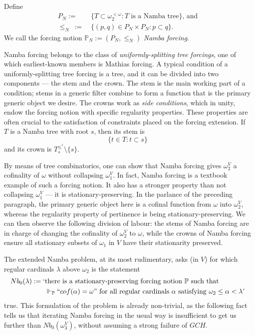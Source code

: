 \documentclass[12pt]{article}
\numberwithin{equation}{section}
\begin{document}
\begin{defi}[Namba]
Define
\begin{align*}
    P_N := \ & \{T \subset \omega_2^{< \omega} : T \text{ is a Namba tree}\} \text{, and} \\
    \leq_N \ := \ & \{(p, q) \in P_N \times P_N : p \subset q\}.
\end{align*}
We call the forcing notion $\mathbb{P}_N := (P_N, \leq_N)$ \emph{Namba forcing}.
\end{defi}

Namba forcing belongs to the class of \emph{uniformly-splitting tree forcings}, one of which earliest-known members is Mathias forcing. A typical condition of a uniformly-splitting tree forcing is a tree, and it can be divided into two components --- the stem and the crown. The stem is the main working part of a condition; stems in a generic filter combine to form a function that is the primary generic object we desire. The crowns work as \emph{side conditions}, which in unity, endow the forcing notion with specific regularity properties. These properties are often crucial to the satisfaction of constraints placed on the forcing extension. If $T$ is a Namba tree with root $s$, then its stem is $$\{t \in T : t \subset s\}$$ and its crown is $T_s^{\leq^{\dagger}} \setminus \{s\}$.

By means of tree combinatorics, one can show that Namba forcing gives $\omega_2^V$ a cofinality of $\omega$ without collapsing $\omega_1^V$. In fact, Namba forcing is a textbook example of such a forcing notion. It also has a stronger property than not collapsing $\omega_1^V$ --- it is stationary-preserving. In the parlance of the preceding paragraph, the primary generic object here is a cofinal function from $\omega$ into $\omega_2^V$, whereas the regularity property of pertinence is being stationary-preserving. We can then observe the following division of labour: the stems of Namba forcing are in charge of changing the cofinality of $\omega_2^V$ to $\omega$, while the crowns of Namba forcing ensure all stationary subsets of $\omega_1$ in $V$ have their stationarity preserved.

The extended Namba problem, at its most rudimentary, asks (in $V$) for which regular cardinals $\lambda$ above $\omega_2$ is the statement
\begin{align*}
    Nb_0(\lambda) := \text{`} & \text{there is a stationary-preserving forcing notion } \mathbb{P} \text{ such that} \\ 
    & \Vdash_{\mathbb{P}} ``cof(\alpha) = \omega" \text{ for all regular cardinals } \alpha \text{ satisfying } \omega_2 \leq \alpha < \lambda \text{'}
\end{align*} 
true. This formulation of the problem is already non-trivial, as the following fact tells us that iterating Namba forcing in the usual way is insufficient to get us further than $Nb_0(\omega_3^V)$, without assuming a strong failure of $GCH$. 
\end{document}
